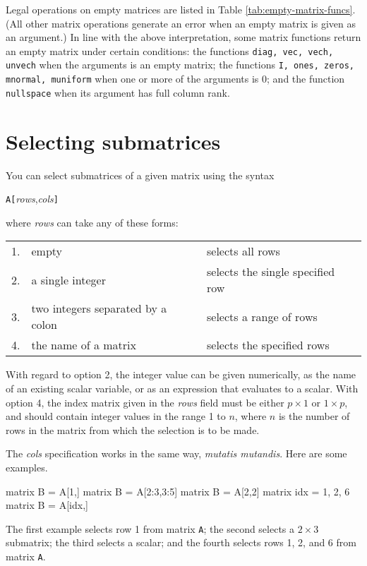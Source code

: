 Legal operations on empty matrices are listed in Table
\ref{tab:empty-matrix-funcs}.  (All other matrix operations generate
an error when an empty matrix is given as an argument.)  In line with
the above interpretation, some matrix functions return an empty matrix
under certain conditions: the functions \texttt{diag, vec, vech,
  unvech} when the arguments is an empty matrix; the functions
\texttt{I, ones, zeros, mnormal, muniform} when one or more of the
arguments is 0; and the function \texttt{nullspace} when its argument
has full column rank.

\section{Selecting submatrices}
\label{sec:matrix-sub}

You can select submatrices of a given matrix using the syntax

\hspace{1em} \texttt{A[}\textsl{rows},\textsl{cols}\texttt{]}

where \textsl{rows} can take any of these forms:

\begin{center}
\begin{tabular}{lll}
1. & empty & selects all rows \\
2. & a single integer & selects the single specified row \\
3. & two integers separated by a colon & selects a range of rows \\
4. & the name of a matrix & selects the specified rows \\
\end{tabular}
\end{center}

With regard to option 2, the integer value can be given numerically,
as the name of an existing scalar variable, or as an expression that
evaluates to a scalar.  With option 4, the index matrix given in the
\textsl{rows} field must be either $p\times 1$ or $1\times p$, and
should contain integer values in the range 1 to $n$, where $n$ is the
number of rows in the matrix from which the selection is to be made.

The \textsl{cols} specification works in the same way, \textit{mutatis
  mutandis}.  Here are some examples.
%
\begin{code}
matrix B = A[1,]
matrix B = A[2:3,3:5]
matrix B = A[2,2]
matrix idx = {1, 2, 6}
matrix B = A[idx,]
\end{code}
%
The first example selects row 1 from matrix \texttt{A}; the second
selects a $2\times 3$ submatrix; the third selects a scalar; and
the fourth selects rows 1, 2, and 6 from matrix \texttt{A}.

